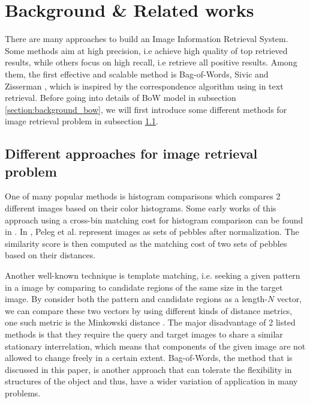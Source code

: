 % 

\section{Background \& Related works} \label{section:background_relatedworks}
There are many approaches to build an Image Information Retrieval System. Some methods aim at high precision, i.e achieve high quality of top retrieved results, while others focus on high recall, i.e retrieve all positive results. Among them, the first effective and scalable method is Bag-of-Words, Sivic and Zisserman \cite{3}, which is inspired by the correspondence algorithm using in text retrieval. Before going into details of BoW model in subsection \ref{section:background_bow}, we will first introduce some different methods for image retrieval problem in subsection \ref{section:background_dif_method}.

\subsection{Different approaches for image retrieval problem} \label{section:background_dif_method}
One of many popular methods is histogram comparisons which compares 2 different images based on their color histograms. Some early works of this approach using a cross-bin matching cost for histogram comparison can be found in \cite{Shen1983187,Werman1985328,Peleg192468}. In \cite{Peleg192468}, Peleg et al. represent images as sets of pebbles after normalization. The similarity score is then computed as the matching cost of two sets of pebbles based on their distances.

Another well-known technique is template matching, i.e. seeking a given pattern in a image by comparing to candidate regions of the same size in the target image. By consider both the pattern and candidate regions as a length-$N$ vector, we can compare these two vectors by using different kinds of distance metrics, one such metric is the Minkowski distance \cite{Ouyang5770267}. The major disadvantage of 2 listed methods is that they require the query and target images to share a similar stationary interrelation, which means that components of the given image are not allowed to change freely in a certain extent. Bag-of-Words, the method that is discussed in this paper, is another approach that can tolerate the flexibility in structures of the object and thus, have a wider variation of application in many problems. 

